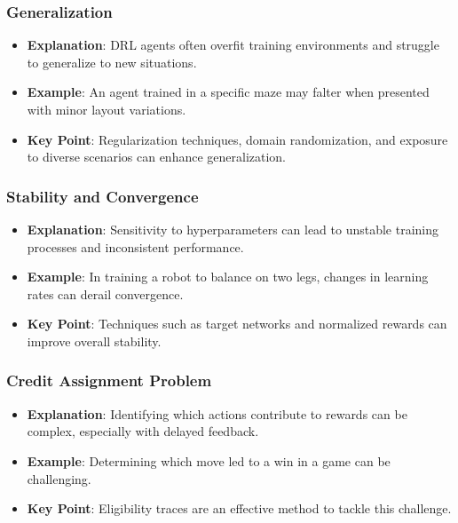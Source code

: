 \documentclass[aspectratio=169]{beamer}
\begin{document}
\begin{frame}[fragile]
    \frametitle{Generalization}
    \begin{itemize}
        \item \textbf{Explanation}: DRL agents often overfit training environments and struggle to generalize to new situations.
        \item \textbf{Example}: An agent trained in a specific maze may falter when presented with minor layout variations.
        \item \textbf{Key Point}: Regularization techniques, domain randomization, and exposure to diverse scenarios can enhance generalization.
    \end{itemize}
\end{frame}

\begin{frame}[fragile]
    \frametitle{Stability and Convergence}
    \begin{itemize}
        \item \textbf{Explanation}: Sensitivity to hyperparameters can lead to unstable training processes and inconsistent performance.
        \item \textbf{Example}: In training a robot to balance on two legs, changes in learning rates can derail convergence.
        \item \textbf{Key Point}: Techniques such as target networks and normalized rewards can improve overall stability.
    \end{itemize}
\end{frame}

\begin{frame}[fragile]
    \frametitle{Credit Assignment Problem}
    \begin{itemize}
        \item \textbf{Explanation}: Identifying which actions contribute to rewards can be complex, especially with delayed feedback.
        \item \textbf{Example}: Determining which move led to a win in a game can be challenging.
        \item \textbf{Key Point}: Eligibility traces are an effective method to tackle this challenge.
    \end{itemize}
\end{frame}
\end{document}
